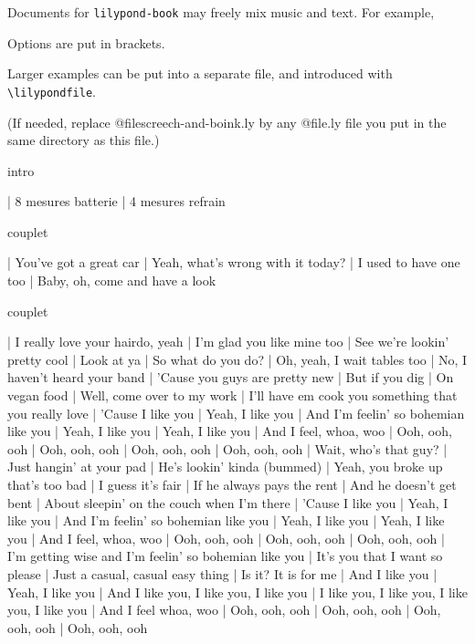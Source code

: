 \documentclass[a4paper]{article}
\begin{document}
Documents for \verb+lilypond-book+ may freely mix music and text.
For example,


Options are put in brackets.


Larger examples can be put into a separate file, and introduced with
\verb+\lilypondfile+.


(If needed, replace @file{screech-and-boink.ly} by any @file{.ly} file
you put in the same directory as this file.)

intro

    | 8 mesures batterie
    | 4 mesures refrain


couplet

	| You've got a great car
	| Yeah, what's wrong with it today?
	| I used to have one too
	| Baby, oh, come and have a look

couplet

	| I really love your hairdo, yeah
	| I'm glad you like mine too
	| See we're lookin' pretty cool
	| Look at ya
	| So what do you do?
	| Oh, yeah, I wait tables too
	| No, I haven't heard your band
	| 'Cause you guys are pretty new
	| But if you dig
	| On vegan food
	| Well, come over to my work
	| I'll have em cook you something that you really love
	| 'Cause I like you
	| Yeah, I like you
	| And I'm feelin' so bohemian like you
	| Yeah, I like you
	| Yeah, I like you
	| And I feel, whoa, woo
	| Ooh, ooh, ooh
	| Ooh, ooh, ooh
	| Ooh, ooh, ooh
	| Ooh, ooh, ooh
	| Wait, who's that guy?
	| Just hangin' at your pad
	| He's lookin' kinda (bummed)
	| Yeah, you broke up that's too bad
	| I guess it's fair
	| If he always pays the rent
	| And he doesn't get bent
	| About sleepin' on the couch when I'm there
	| 'Cause I like you
	| Yeah, I like you
	| And I'm feelin' so bohemian like you
	| Yeah, I like you
	| Yeah, I like you
	| And I feel, whoa, woo
	| Ooh, ooh, ooh
	| Ooh, ooh, ooh
	| Ooh, ooh, ooh
	| I'm getting wise and I'm feelin' so bohemian like you
	| It's you that I want so please
	| Just a casual, casual easy thing
	| Is it? It is for me
	| And I like you
	| Yeah, I like you
	| And I like you, I like you, I like you
	| I like you, I like you, I like you, I like you
	| And I feel whoa, woo
	| Ooh, ooh, ooh
	| Ooh, ooh, ooh
	| Ooh, ooh, ooh
	| Ooh, ooh, ooh
\end{document}
